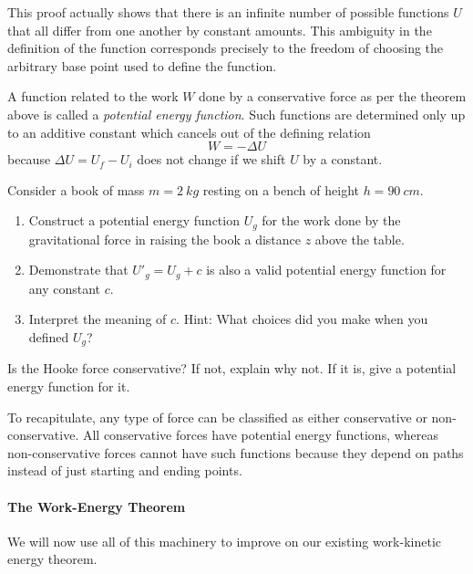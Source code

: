 This proof actually shows that there is an infinite number of possible functions $U$ that all differ from one another by constant amounts. This ambiguity in the definition of the function corresponds precisely to the freedom of choosing the arbitrary base point used to define the function.
\begin{definition}
A function related to the work $W$ done by a conservative force as per the theorem above is called a {\em potential energy function}. Such functions are determined only up to an additive constant which cancels out of the defining relation 
$$
W= - ΔU 
$$
because $ΔU = U_f - U_i$ does not change if we shift $U$ by a constant. 
\end{definition}

\begin{exercise}
Consider a book of mass $m = 2\ kg$ resting on a bench of height $h = 90\ cm$. 
\begin{enumerate}
	\item Construct a potential energy function $U_g$ for the work done by the gravitational force in raising the book a distance $z$ above the table. 
	\item Demonstrate that $U'_g = U_g + c$ is also a valid potential energy function for any constant $c$. 
	\item Interpret the meaning of $c$. Hint: What choices did you make when you defined $U_g$?
\end{enumerate}
\end{exercise}

\begin{exercise}
Is the Hooke force conservative? If not, explain why not. If it is, give a potential energy function for it.
\end{exercise}


To recapitulate, any type of force can be classified as either conservative or non-conservative. All conservative forces have potential energy functions, whereas non-conservative forces cannot have such functions because they depend on paths instead of just starting and ending points. 

\paragraph{The Work-Energy Theorem}
We will now use all of this machinery to improve on our existing work-kinetic energy theorem.

